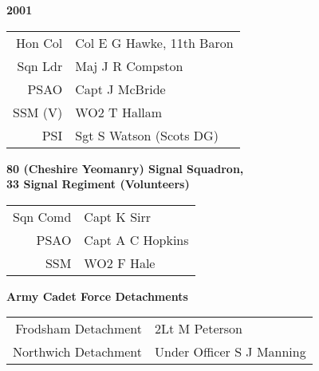 \begin{center}
  \Huge
  \textbf{2001}
\end{center}

\begin{center}
  \small
  \begin{tabular}{rl}
    Hon Col & Col E G Hawke, 11th Baron \\
    Sqn Ldr & Maj J R Compston \\
    PSAO & Capt J McBride \\
    SSM (V) & WO2 T Hallam \\
    PSI & Sgt S Watson (Scots DG) \\
  \end{tabular}
\end{center}

\begin{center}
  \Large
  \textbf{80 (Cheshire Yeomanry) Signal Squadron, \\ 33 Signal Regiment (Volunteers)}
\end{center}

\begin{center}
  \small
  \begin{tabular}{rl}
    Sqn Comd & Capt K Sirr \\
    PSAO & Capt A C Hopkins \\
    SSM & WO2 F Hale \\
  \end{tabular}
\end{center}

\begin{center}
  \Large
  \textbf{Army Cadet Force Detachments}
\end{center}

\begin{center}
  \small
  \begin{tabular}{rl}
    Frodsham Detachment & 2Lt M Peterson \\
    Northwich Detachment & Under Officer S J Manning \\
  \end{tabular}
\end{center}

\vspace{50mm}

\pagebreak
